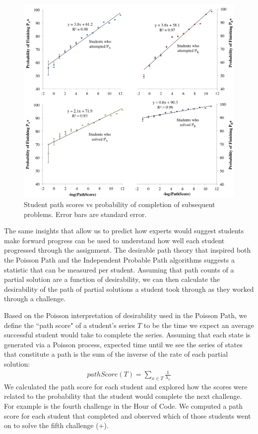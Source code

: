\begin{figure}[!ht]
\begin{center}
\includegraphics[width=1.0\textwidth]{img/future}

\end{center}
\caption{Student path scores vs probability of completion of subsequent problems. Error bars are standard error.
 }
\label{fig:predacc}
\end{figure}

The same insights that allow us to predict how experts would suggest students make forward progress can be used to understand how well each student progressed through the assignment. The desirable path theory that inspired both the Poisson Path and the Independent Probable Path algorithms suggests a statistic that can be measured per student. Assuming that path counts of a partial solution are a function of desirability, we can then calculate the desirability of the path of partial solutions a student took through as they worked through a challenge. 

Based on the Poisson interpretation of desirability used in the Poisson Path, we define the ``path score" of a student's series $T$ to be the time we expect an average successful student would take to complete the series. Assuming that each state is generated via a Poisson process, expected time until we see the series of states that constitute a path is the sum of the inverse of the rate of each partial solution:
\begin{align*}
 pathScore(T) = \sum_{x \in T}{\frac{1}{\lambda_x}}
\end{align*}
 We calculated the path score for each student and explored how the scores were related to the probability that the student would complete the next challenge. For example \Pa is the fourth challenge in the Hour of Code. We computed a path score for each student that completed \Pa and observed which of those students went on to solve the fifth challenge (\Pa+).



